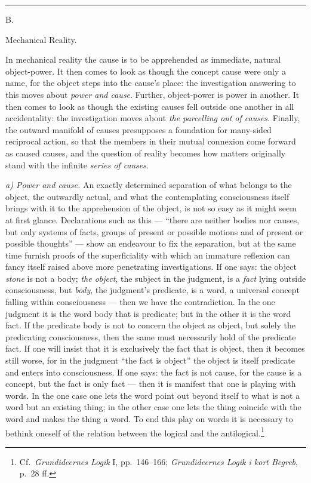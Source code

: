 \documentclass[12pt,a4paper]{book}
\newcommand{\afdeling}[2]{%
  \par\vspace{1.3\baselineskip}%
  {\centering #1\par\vspace{0.2\baselineskip}\normalsize #2\par}%
  \addcontentsline{toc}{section}{#1 #2}%
  \vspace{0.8\baselineskip}\par\nointerlineskip}
\newcommand{\streg}{\begin{center}\rule{2cm}{0.4pt}\end{center}}
\newcommand{\runin}[1]{\emph{#1}\hspace{0.4em}}
\begin{document}
\streg

\afdeling{B.}{Mechanical Reality.}

In mechanical reality the cause is to be apprehended as immediate, natural object-power. It
then comes to look as though the concept cause were only a name, for the object steps into the
cause's place: the investigation answering to this moves about \emph{power and cause}. Further,
object-power is power in another. It then comes to look as though the existing causes fell
outside one another
in all accidentality: the investigation moves about \emph{the parcelling out of causes}.
Finally, the outward manifold of causes presupposes a foundation for many-sided reciprocal
action, so that the members in their mutual connexion come forward as caused causes, and the
question of reality becomes how matters originally stand with the infinite \emph{series of
causes}.

\runin{a) Power and cause.} An exactly determined separation of what belongs to the object, the
outwardly actual, and what the contemplating consciousness itself brings with it to the
apprehension of the object, is not so easy as it might seem at first glance. Declarations such
as this --- ``there are neither bodies nor causes, but only systems of facts, groups of present
or possible motions and of present or possible thoughts'' --- show an endeavour to fix the
separation, but at the same time furnish proofs of the superficiality with which an immature
reflexion can fancy itself raised above more penetrating investigations. If one says: the object
\emph{stone} is not a body; \emph{the object}, the subject in the judgment, is a \emph{fact}
lying outside consciousness, but \emph{body}, the judgment's predicate, is a word, a universal
concept falling within consciousness --- then we have the contradiction. In the one judgment it
is the word body that is predicate; but in the other it is the word fact. If the predicate body
is not to concern the object as object, but solely the predicating consciousness, then the same
must necessarily hold of the predicate fact. If one will insist that it is exclusively the fact
that is object, then it becomes still worse, for in the judgment ``the fact is object'' the
object is itself predicate and enters into consciousness. If one says: the fact is not cause,
for the cause is a concept, but the fact is only fact --- then it is manifest that
one is playing with words. In the one case one lets the word point out beyond itself to what is
not a word but an existing thing; in the other case one lets the thing coincide with the word
and makes the thing a word. To end this play on words it is necessary to bethink oneself of the
relation between the logical and the antilogical.\footnote{%
Cf.\ \textit{Grundideernes Logik} I, pp.\ 146--166; \textit{Grundideernes Logik i kort Begreb},
p.\ 28 ff.}
\end{document}
